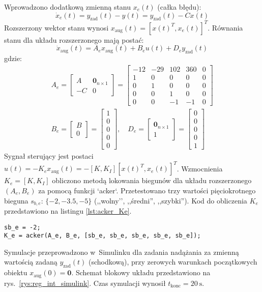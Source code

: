 \documentclass[a4paper,titlepage,11pt,floatssmall]{mwrep} %
\begin{document}
Wprowadzono dodatkową zmienną stanu $x_e(t)$ (całka błędu):
\begin{equation}
    \dot{x}_e(t) = y_{\text{zad}}(t) - y(t) = y_{\text{zad}}(t) - Cx(t)
\end{equation}
Rozszerzony wektor stanu wynosi $x_{\text{aug}}(t) = [x(t)^T, x_e(t)]^T$. Równania stanu dla układu rozszerzonego mają postać:
\begin{equation}
    \dot{x}_{\text{aug}}(t) = A_e x_{\text{aug}}(t) + B_e u(t) + D_e y_{\text{zad}}(t)
\end{equation}
gdzie:
\begin{gather}
A_e = \begin{bmatrix} A & \boldsymbol{0}_{n \times 1} \\ -C & 0 \end{bmatrix} = \begin{bmatrix} -12 & -29 & 102 & 360 & 0 \\ 1 & 0 & 0 & 0 & 0 \\ 0 & 1 & 0 & 0 & 0 \\ 0 & 0 & 1 & 0 & 0 \\ 0 & 0 & -1 & -1 & 0 \end{bmatrix} \\
B_e = \begin{bmatrix} B \\ 0 \end{bmatrix} = \begin{bmatrix} 1 \\ 0 \\ 0 \\ 0 \\ 0 \end{bmatrix}, \quad
D_e = \begin{bmatrix} \boldsymbol{0}_{n \times 1} \\ 1 \end{bmatrix} = \begin{bmatrix} 0 \\ 0 \\ 0 \\ 0 \\ 1 \end{bmatrix}
\end{gather}
Sygnał sterujący jest postaci $u(t) = -K_e x_{\text{aug}}(t) = -[K, K_I] [x(t)^T, x_e(t)]^T$. Wzmocnienia $K_e = [K, K_I]$ obliczono metodą lokowania biegunów dla układu rozszerzonego $(A_e, B_e)$ za pomocą funkcji `acker`. Przetestowano trzy wartości pięciokrotnego bieguna $s_{b,e}$: $\{-2, -3.5, -5\}$ (,,wolny'', ,,średni'', ,,szybki''). Kod do obliczenia $K_e$ przedstawiono na listingu \ref{lst:acker_Ke}.
\begin{lstlisting}[style=custommatlab, caption={Obliczenie wzmocnień regulatora z całkowaniem Ke.}, label={lst:acker_Ke}]
sb_e = -2;
K_e = acker(A_e, B_e, [sb_e, sb_e, sb_e, sb_e, sb_e]);
\end{lstlisting}
Symulacje przeprowadzono w~Simulinku dla zadania nadążania za zmienną wartością zadaną $y_{\text{zad}}(t)$ (schodkową), przy zerowych warunkach początkowych obiektu $x_{\text{aug}}(0) = \boldsymbol{0}$. Schemat blokowy układu przedstawiono na rys.~\ref{rys:reg_int_simulink}. Czas symulacji wynosił $t_{\text{konc}} = \SI{20}{\second}$.
\end{document}
